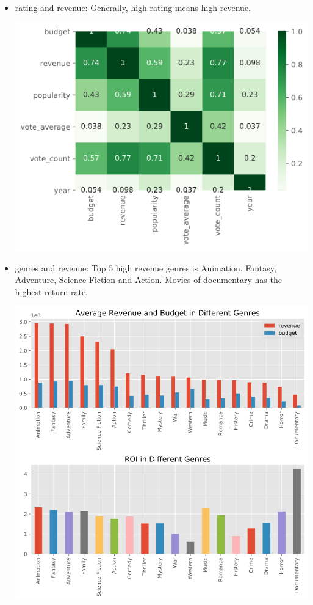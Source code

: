 \documentclass[UTF8]{article}
\begin{document}
\begin{itemize}
\begin{itemize}
\begin{center}
                    \end{center}
              \item rating and revenue: Generally, high rating means high revenue.
                    \begin{center}
                        \includegraphics[scale=0.5]{Img/rating.png}
                    \end{center}
              \item genres and revenue: Top 5 high revenue genres is Animation, Fantasy, Adventure, Science Fiction and Action.
                    Movies of documentary has the highest return rate.
                    \begin{center}
                        \includegraphics[scale=0.5]{Img/genres.png}

\end{center}
\end{itemize}
\end{itemize}
\end{document}
